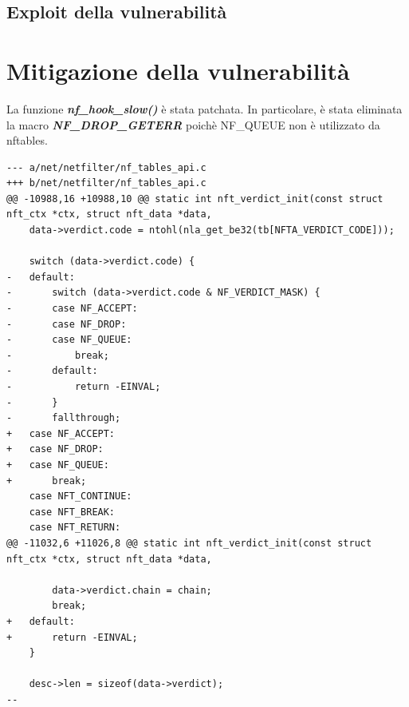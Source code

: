 \documentclass{article}
\begin{document}
\subsection{Exploit della vulnerabilità}

\clearpage

\section{Mitigazione della vulnerabilità}
La funzione \textbf{\textit{nf\_hook\_slow()}} è stata patchata. In particolare, è stata 
eliminata la macro \textbf{\textit{NF\_DROP\_GETERR}} poichè NF\_QUEUE non è utilizzato da 
nftables. 

\begin{verbatim}
--- a/net/netfilter/nf_tables_api.c
+++ b/net/netfilter/nf_tables_api.c
@@ -10988,16 +10988,10 @@ static int nft_verdict_init(const struct nft_ctx *ctx, struct nft_data *data,
 	data->verdict.code = ntohl(nla_get_be32(tb[NFTA_VERDICT_CODE]));
 
 	switch (data->verdict.code) {
-	default:
-		switch (data->verdict.code & NF_VERDICT_MASK) {
-		case NF_ACCEPT:
-		case NF_DROP:
-		case NF_QUEUE:
-			break;
-		default:
-			return -EINVAL;
-		}
-		fallthrough;
+	case NF_ACCEPT:
+	case NF_DROP:
+	case NF_QUEUE:
+		break;
 	case NFT_CONTINUE:
 	case NFT_BREAK:
 	case NFT_RETURN:
@@ -11032,6 +11026,8 @@ static int nft_verdict_init(const struct nft_ctx *ctx, struct nft_data *data,
 
 		data->verdict.chain = chain;
 		break;
+	default:
+		return -EINVAL;
 	}
 
 	desc->len = sizeof(data->verdict);
--  
\end{verbatim}
\clearpage

\nocite{*}

% 

\end{document}
